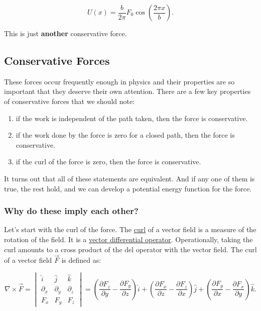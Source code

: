 \documentclass[11pt]{article}
\providecommand{\tightlist}{%
      \setlength{\itemsep}{0pt}\setlength{\parskip}{0pt}}
\begin{document}
\[U(x) = \dfrac{b}{2\pi}F_0 \cos \left(\dfrac{2\pi x}{b}\right).\]

This is just \textbf{another} conservative force.

    \subsection{Conservative Forces}\label{conservative-forces}

These forces occur frequently enough in physics and their properties are
so important that they deserve their own attention. There are a few key
properties of conservative forces that we should note:

\begin{enumerate}
\def\labelenumi{\arabic{enumi}.}
\tightlist
\item
  if the work is independent of the path taken, then the force is
  conservative.
\item
  if the work done by the force is zero for a closed path, then the
  force is conservative.
\item
  if the curl of the force is zero, then the force is conservative.
\end{enumerate}

It turns out that all of these statements are equivalent. And if any one
of them is true, the rest hold, and we can develop a potential energy
function for the force.

\subsubsection{Why do these imply each
other?}\label{why-do-these-imply-each-other}

Let's start with the curl of the force. The
\href{https://en.wikipedia.org/wiki/Curl}{curl} of a vector field is a
measure of the rotation of the field. It is a
\href{https://en.wikipedia.org/wiki/Vector_calculus_operator}{vector
differential operator}. Operationally, taking the curl amounts to a
cross product of the del operator with the vector field. The curl of a
vector field \(\vec{F}\) is defined as:

\[\nabla \times \vec{F} = \begin{vmatrix}\hat{i} & \hat{j} & \hat{k} \\ \partial_x & \partial_y & \partial_z \\ F_x & F_y & F_z \end{vmatrix} = \left(\dfrac{\partial F_z}{\partial y} - \dfrac{\partial F_y}{\partial z}\right)\hat{i} + \left(\dfrac{\partial F_x}{\partial z} - \dfrac{\partial F_z}{\partial x}\right)\hat{j} + \left(\dfrac{\partial F_y}{\partial x} - \dfrac{\partial F_x}{\partial y}\right)\hat{k}.\]
\end{document}
